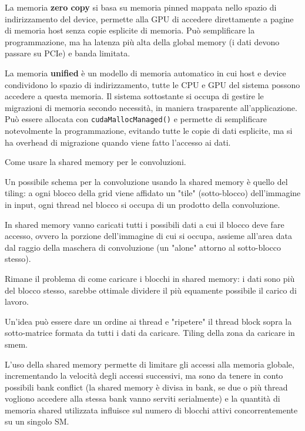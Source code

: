 \begin{questions}
\begin{solution}
        La memoria \textbf{zero copy} si basa su memoria pinned mappata nello spazio di indirizzamento del device, permette alla GPU di accedere direttamente a pagine di memoria host senza copie esplicite di memoria. Può semplificare la programmazione, ma ha latenza più alta della global memory (i dati devono passare su PCIe) e banda limitata.
        
        La memoria \textbf{unified} è un modello di memoria automatico in cui host e device condividono lo spazio di indirizzamento, tutte le CPU e GPU del sistema possono accedere a questa memoria. Il sistema sottostante si occupa di gestire le migrazioni di memoria secondo necessità, in maniera trasparente all'applicazione. Può essere allocata con \texttt{cudaMallocManaged()} e permette di semplificare notevolmente la programmazione, evitando tutte le copie di dati esplicite, ma si ha overhead di migrazione quando viene fatto l'accesso ai dati.
    \end{solution}
    
    \question Come usare la shared memory per le convoluzioni.
    
    \begin{solution}
        Un possibile schema per la convoluzione usando la shared memory è quello del tiling: a ogni blocco della grid viene affidato un "tile" (sotto-blocco) dell'immagine in input, ogni thread nel blocco si occupa di un prodotto della convoluzione. 
        
        In shared memory vanno caricati tutti i possibili dati a cui il blocco deve fare accesso, ovvero la porzione dell'immagine di cui si occupa, assieme all'area data dal raggio della maschera di convoluzione (un "alone" attorno al sotto-blocco stesso).
        
        Rimane il problema di come caricare i blocchi in shared memory: i dati sono più del blocco stesso, sarebbe ottimale dividere il più equamente possibile il carico di lavoro. 
        
        Un'idea può essere dare un ordine ai thread e "ripetere" il thread block sopra la sotto-matrice formata da tutti i dati da caricare. Tiling della zona da caricare in smem.
        
        L'uso della shared memory permette di limitare gli accessi alla memoria globale, incrementando la velocità degli accessi successivi, ma sono da tenere in conto possibili bank conflict (la shared memory è divisa in bank, se due o più thread vogliono accedere alla stessa bank vanno serviti serialmente) e la quantità di memoria shared utilizzata influisce sul numero di blocchi attivi concorrentemente su un singolo SM.
    \end{solution}
    

\end{questions}
